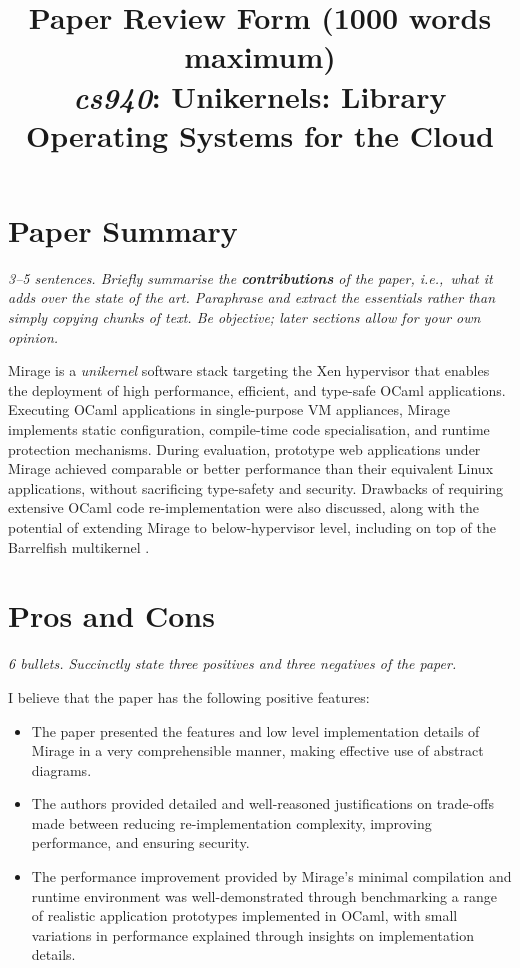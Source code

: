 \documentclass[11pt]{article}
\begin{document}
\title{Paper Review Form (1000 words maximum)\\
  \emph{cs940}: Unikernels: Library Operating Systems for the Cloud \cite{madhavapeddy2013unikernels}}
\maketitle

\section*{Paper Summary}
\textsl{3--5 sentences. Briefly summarise the {\bf contributions} of the paper, i.e.,~what it adds over the state of the art. Paraphrase and extract the essentials rather than simply copying chunks of text. Be objective; later sections allow for your own opinion.}

Mirage is a \emph{unikernel} software stack targeting the Xen hypervisor that enables the deployment of high performance, efficient, and type-safe OCaml applications. Executing OCaml applications in single-purpose VM appliances, Mirage implements static configuration, compile-time code specialisation, and runtime protection mechanisms. During evaluation, prototype web applications under Mirage achieved comparable or better performance than their equivalent Linux applications, without sacrificing type-safety and security. Drawbacks of requiring extensive OCaml code re-implementation were also discussed, along with the potential of extending Mirage to below-hypervisor level, including on top of the Barrelfish multikernel \cite{baumann2009multikernel}.

\section*{Pros and Cons}
\textsl{6 bullets. Succinctly state three positives and three negatives of the paper.}

I believe that the paper has the following positive features:
\begin{itemize}
	\item The paper presented the features and low level implementation details of Mirage in a very comprehensible manner, making effective use of abstract diagrams. 
	\item The authors provided detailed and well-reasoned justifications on trade-offs made between reducing re-implementation complexity, improving performance, and ensuring security.
	\item The performance improvement provided by Mirage's minimal compilation and runtime environment was well-demonstrated through benchmarking a range of realistic application prototypes implemented in OCaml, with small variations in performance explained through insights on implementation details.
\end{itemize}
\end{document}

